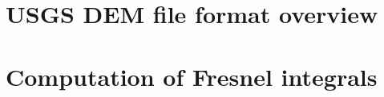 \chapter{USGS DEM file format overview}
\label{app:usgsdem}



\chapter{Computation of Fresnel integrals}
\label{app:fresnel}

